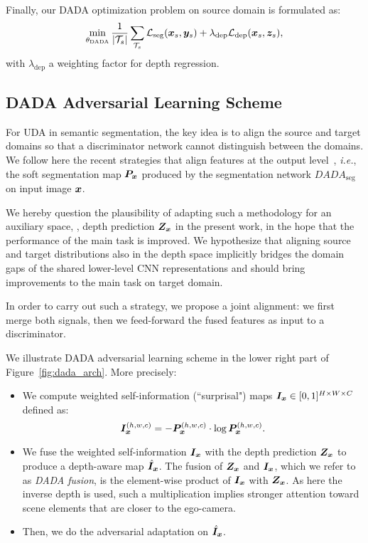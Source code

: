 \documentclass[10pt,twocolumn,letterpaper]{article}
\newcommand{\src}[1]{#1_s}
\newcommand{\cT}{\mathcal{T}}
\newcommand{\seg}{\mathrm{seg}}
\newcommand{\dep}{\mathrm{dep}}
\begin{document}
Finally, our DADA optimization problem on source domain is formulated as:
\begin{equation}\label{eq:onlysourcemtl}
\vspace{-0.05cm}
\min_{\theta_{\mathrm{DADA}}} \frac{1}{\left|\cT_s\right|}
\sum_{\cT_s} \mathcal{L}_{\seg}(\src{\mm x}, \src{\mm y})
+ \lambda_{\dep}\mathcal{L}_{\dep}(\src{\mm x}, \src{\mm z}),
\vspace{-0.05cm}
\end{equation}
with $\lambda_{\dep}$ a weighting factor for depth regression.

\subsection{DADA Adversarial Learning Scheme}\label{sec:dada_learning}
For UDA in semantic segmentation, the key idea is to align the source and target domains so that a discriminator network cannot distinguish between the domains.
We follow here the recent strategies that align features at the output level~\cite{tsai2018learning,vu2018advent}, \textit{i.e.}, the soft segmentation map $\bm{P}_{\bm{x}}$ produced by the segmentation network $DADA_{\seg}$ on input image $\bm{x}$.

We hereby question the plausibility of adapting such a methodology for an auxiliary space, \ie, depth prediction $\bm{Z}_{\bm{x}}$ in the present work, in the hope that the performance of the main task is improved.
We hypothesize that aligning source and target distributions also in the depth space implicitly bridges the domain gaps of the shared lower-level CNN representations and should bring improvements to the main task on target domain.

In order to carry out such a strategy, we propose a joint alignment:  we first merge  both signals, then we feed-forward the fused features as input to a discriminator.  

We illustrate DADA adversarial learning scheme in the lower right part of Figure~\ref{fig:dada_arch}.
More precisely:
\begin{itemize}
	\setlength{\parskip}{0pt}
	\setlength{\itemsep}{1pt}
    \item  We compute weighted self-information (``surprisal") maps \cite{vu2018advent} $\bm{I}_{\bm{x}}\in[0,1]^{H\times W\times C}$ defined as: 
    \begin{equation}
    \bm{I}_{\bm{x}}^{(h,w,c)} = -\bm{P}_{\bm{x}}^{(h,w,c)}\cdot\log \bm{P}_{\bm{x}}^{(h,w,c)}.
    \end{equation}
	\item We fuse the weighted self-information $\bm{I}_{\bm{x}}$ with the depth prediction $\bm{Z}_{\bm{x}}$ to produce a depth-aware map $\hat{\bm{I}}_{\bm{x}}$.
	The fusion of $\bm{Z}_{\bm{x}}$ and $\bm{I}_{\bm{x}}$, which we refer to as \textit{DADA fusion}, is the element-wise product of  $\bm{I}_{\bm{x}}$ with $\bm{Z_{\bm{x}}}$.
	As here the inverse depth is used, such a multiplication implies stronger attention toward scene elements that are closer to the ego-camera.
	\item Then, we do the adversarial adaptation on $\hat{\bm{I}}_{\bm{x}}$.
\end{itemize}
\end{document}
